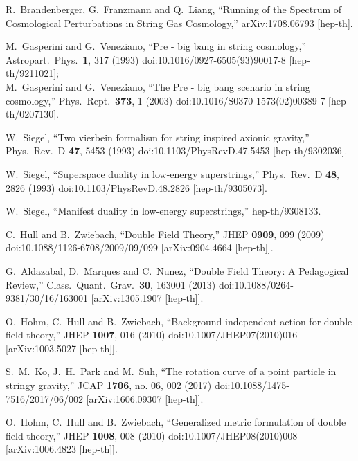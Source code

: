 \documentclass[prd, aps, superscriptaddress, preprintnumbers, twocolumn, floatfix, nofootinbib]{revtex4}
\begin{document}
\begin{thebibliography}{99}
R.~Brandenberger, G.~Franzmann and Q.~Liang,
  ``Running of the Spectrum of Cosmological Perturbations in String Gas Cosmology,''
  arXiv:1708.06793 [hep-th].

M.~Gasperini and G.~Veneziano,
``Pre - big bang in string cosmology,''
Astropart.\ Phys.\  {\bf 1}, 317 (1993)
doi:10.1016/0927-6505(93)90017-8 [hep-th/9211021];\\
M.~Gasperini and G.~Veneziano,
``The Pre - big bang scenario in string cosmology,''
Phys.\ Rept.\  {\bf 373}, 1 (2003)
doi:10.1016/S0370-1573(02)00389-7 [hep-th/0207130].

W.~Siegel,
``Two vierbein formalism for string inspired axionic gravity,''
Phys.\ Rev.\ D {\bf 47}, 5453 (1993)
doi:10.1103/PhysRevD.47.5453
[hep-th/9302036].

W.~Siegel,
``Superspace duality in low-energy superstrings,''
Phys.\ Rev.\ D {\bf 48}, 2826 (1993)
doi:10.1103/PhysRevD.48.2826
[hep-th/9305073].

W.~Siegel,
``Manifest duality in low-energy superstrings,''
hep-th/9308133.

C.~Hull and B.~Zwiebach,
``Double Field Theory,''
JHEP {\bf 0909}, 099 (2009)
doi:10.1088/1126-6708/2009/09/099
[arXiv:0904.4664 [hep-th]].

G.~Aldazabal, D.~Marques and C.~Nunez,
  ``Double Field Theory: A Pedagogical Review,''
  Class.\ Quant.\ Grav.\  {\bf 30}, 163001 (2013)
  doi:10.1088/0264-9381/30/16/163001
  [arXiv:1305.1907 [hep-th]].


  O.~Hohm, C.~Hull and B.~Zwiebach,
  ``Background independent action for double field theory,''
  JHEP {\bf 1007}, 016 (2010)
  doi:10.1007/JHEP07(2010)016
  [arXiv:1003.5027 [hep-th]].

  S.~M.~Ko, J.~H.~Park and M.~Suh,
  ``The rotation curve of a point particle in stringy gravity,''
  JCAP {\bf 1706}, no. 06, 002 (2017)
  doi:10.1088/1475-7516/2017/06/002
  [arXiv:1606.09307 [hep-th]].

 O.~Hohm, C.~Hull and B.~Zwiebach,
``Generalized metric formulation of double field theory,''
JHEP {\bf 1008}, 008 (2010)
doi:10.1007/JHEP08(2010)008
[arXiv:1006.4823 [hep-th]].


\end{thebibliography}
\end{document}
